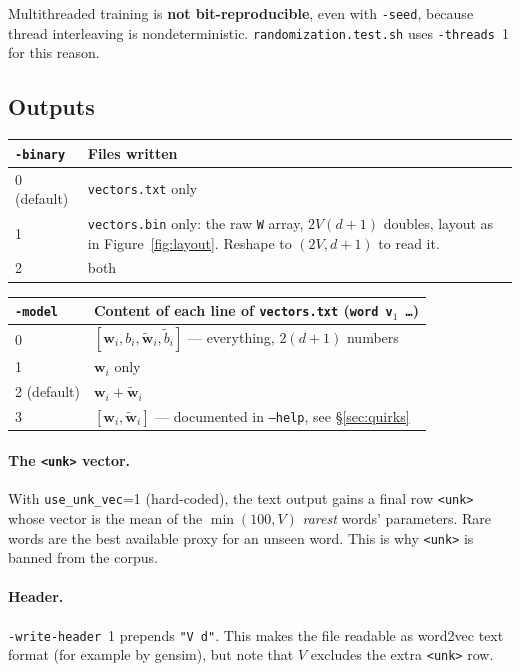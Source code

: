 \documentclass[11pt,a4paper]{article}
\newcommand{\file}[1]{\texttt{#1}}
\newcommand{\opt}[1]{\texttt{-#1}}
\newcommand{\wv}{\mathbf{w}}
\newcommand{\cv}{\tilde{\mathbf{w}}}
\begin{document}
\begin{pitfall}
Multithreaded training is \textbf{not bit-reproducible}, even with \opt{seed}, because
thread interleaving is nondeterministic. \file{randomization.test.sh} uses
\opt{threads}~1 for this reason.
\end{pitfall}

\subsection{Outputs}
\label{sec:outputs}

\begin{center}
\begin{tabularx}{\linewidth}{lX}
\toprule
\opt{binary} & Files written \\
\midrule
0 (default) & \file{vectors.txt} only \\
1 & \file{vectors.bin} only: the raw \texttt{W} array, $2V(d+1)$ doubles, layout as in
    Figure~\ref{fig:layout}. Reshape to $(2V, d+1)$ to read it. \\
2 & both \\
\bottomrule
\end{tabularx}

\vspace{6pt}
\begin{tabularx}{\linewidth}{lX}
\toprule
\opt{model} & Content of each line of \file{vectors.txt} (\texttt{word v$_1$ \ldots}) \\
\midrule
0 & $[\wv_i, b_i, \cv_i, \tilde b_i]$ --- everything, $2(d+1)$ numbers \\
1 & $\wv_i$ only \\
2 (default) & $\wv_i + \cv_i$ \\
3 & $[\wv_i, \cv_i]$ --- documented in \texttt{--help}, see \S\ref{sec:quirks} \\
\bottomrule
\end{tabularx}
\end{center}

\paragraph{The \texttt{<unk>} vector.} With \texttt{use\_unk\_vec}=1 (hard-coded), the text
output gains a final row \texttt{<unk>} whose vector is the mean of the
$\min(100,V)$ \emph{rarest} words' parameters. Rare words are the best available proxy
for an unseen word. This is why \texttt{<unk>} is banned from the corpus.

\paragraph{Header.} \opt{write-header}~1 prepends \texttt{"V d"}. This makes the file
readable as word2vec text format (for example by gensim), but note that $V$ excludes the
extra \texttt{<unk>} row.
\end{document}
